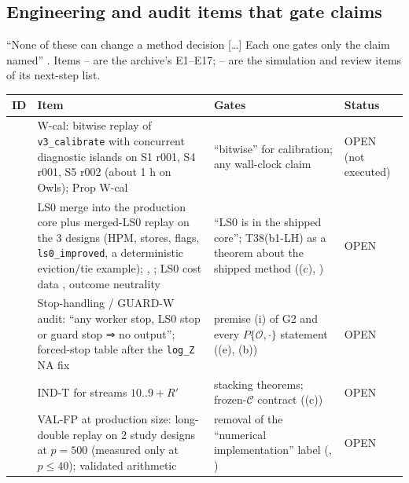 \subsection{Engineering and audit items that gate claims}\label{sec:open:eng}

``None of these can change a method decision [\ldots] Each one gates only the claim named'' . Items -- are the archive's E1--E17; -- are the simulation and review items of its next-step list.

{\small
\begin{xltabular}{\textwidth}{@{}>{\raggedright\arraybackslash}p{1.2cm}>{\raggedright\arraybackslash}X >{\raggedright\arraybackslash}p{3.6cm}>{\raggedright\arraybackslash}p{2.2cm}@{}}
\toprule
\textbf{ID} & \textbf{Item} & \textbf{Gates} & \textbf{Status} \\
\midrule
\endhead
{} & W-cal: bitwise replay of \texttt{v3\_calibrate} with concurrent diagnostic islands on S1 r001, S4 r001, S5 r002 (about 1 h on Owls); Prop W-cal   & ``bitwise'' for calibration; any wall-clock claim & OPEN (not executed) \\
 & LS0 merge into the production core plus merged-LS0 replay on the 3 designs (HPM, stores, flags, \texttt{ls0\_improved}, a deterministic eviction/tie example); , ; LS0 cost data , outcome neutrality   & ``LS0 is in the shipped core''; T38(b1-LH) as a theorem about the shipped method ((c), ) & OPEN \\
 & Stop-handling / GUARD-W audit: ``any worker stop, LS0 stop or guard stop ⇒ no output''; forced-stop table after the \texttt{log\_Z} NA fix  & premise (i) of G2 and every $P\{\mathcal{O},\cdot\}$ statement ((e), (b)) & OPEN \\
 & IND-T for streams $10..9+R'$  & stacking theorems; frozen-$\mathcal{C}$ contract ((c)) & OPEN \\
 & VAL-FP at production size: long-double replay on 2 study designs at $p=500$ (measured only at $p\le40$); validated arithmetic  & removal of the ``numerical implementation'' label (, ) & OPEN \\

\end{xltabular}}
